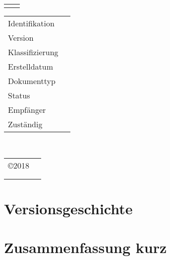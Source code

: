\documentclass[10pt]{article}
\renewcommand{\maketitle}{
  \begin{flushleft}
    {\LARGE \textbf{\cTitle}} \\
    \vspace{0.5cm}
    \hrulefill \\
    \vspace{0.5cm}
  \end{flushleft}

  \begin{flushleft}
    \begin{tabular}{ p{2.3cm} l }
      & {\large \textbf{\cSubtitle}} \\
    \end{tabular}
    \vspace{0.5cm}
  \end{flushleft}
  \begin{flushleft}
    \begin{tabular}{ p{2.3cm} l }
      Identifikation & \cIdentification \\
      Version & \cVersion \\
      Klassifizierung & \cClassification \\
      Erstelldatum & \cCreationdate \\
      Dokumenttyp & \cDocumenttype \\
      Status & \cDocStatus \\
      Empfänger & \cRecipient \\
      Zuständig & \cResponsible \\
    \end{tabular}
  \end{flushleft}
  \begin{flushleft}
    \vspace{0.5cm}
    \hrulefill \\
    \vspace{0.5cm}
  \end{flushleft}
  \begin{flushleft}
    \begin{tabular}{ p{2.3cm} l }
      \copyright\hspace{0.3em}2018 & \cCompany \\
      & \cAddress \\
      & \cPlace \\
    \end{tabular}
  \end{flushleft}

}
\begin{document}
\clearpage
\hfill
\vspace{2cm}
\maketitle
\thispagestyle{plain}

\clearpage
\tableofcontents

\clearpage
\section*{Versionsgeschichte}


\section*{Zusammenfassung kurz}

\clearpage
\end{document}

